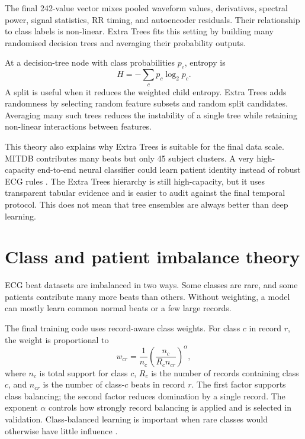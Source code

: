 The final 242-value vector mixes pooled waveform values, derivatives, spectral
power, signal statistics, RR timing, and autoencoder residuals. Their
relationship to class labels is non-linear. Extra Trees fits this setting by
building many randomised decision trees and averaging their probability
outputs.

At a decision-tree node with class probabilities $p_c$, entropy is
\begin{equation}
 H=-\sum_c p_c\log_2 p_c.
\end{equation}
A split is useful when it reduces the weighted child entropy. Extra Trees adds
randomness by selecting random feature subsets and random split candidates.
Averaging many such trees reduces the instability of a single tree while
retaining non-linear interactions between features.

This theory also explains why Extra Trees is suitable for the final data scale.
MITDB contributes many beats but only 45 subject clusters. A very high-capacity
end-to-end neural classifier could learn patient identity instead of robust ECG
rules \cite{zhang2021interpatient}. The Extra Trees hierarchy is still
high-capacity, but it uses transparent tabular evidence and is easier to audit
against the final temporal protocol. This does not mean that tree ensembles are
always better than deep learning.

\section{Class and patient imbalance theory}

ECG beat datasets are imbalanced in two ways. Some classes are rare, and some
patients contribute many more beats than others. Without weighting, a model can
mostly learn common normal beats or a few large records.

The final training code uses record-aware class weights. For class $c$ in
record $r$, the weight is proportional to
\begin{equation}
 w_{cr}=\frac{1}{n_c}
 \left(\frac{n_c}{R_c n_{cr}}\right)^\alpha,
 \label{eq:record-weight}
\end{equation}
where $n_c$ is total support for class $c$, $R_c$ is the number of records
containing class $c$, and $n_{cr}$ is the number of class-$c$ beats in record
$r$. The first factor supports class balancing; the second factor reduces
domination by a single record. The exponent $\alpha$ controls how strongly
record balancing is applied and is selected in validation. Class-balanced
learning is important when rare classes would otherwise have little influence
\cite{cui2019classbalanced}.

